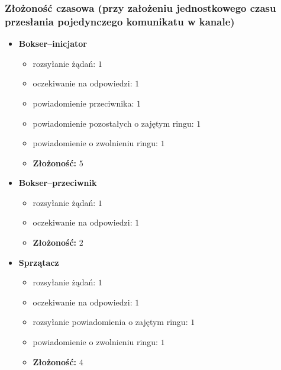 \documentclass{article}
\begin{document}
\subsubsection{Złożoność czasowa (przy założeniu jednostkowego czasu przesłania pojedynczego komunikatu w kanale)}
\begin{itemize}
\item \textbf{Bokser--inicjator}
  \begin{itemize}
  \item rozsyłanie żądań: $1$
  \item oczekiwanie na odpowiedzi: $1$
  \item powiadomienie przeciwnika: $1$
  \item powiadomienie pozostałych o zajętym ringu: $1$
  \item powiadomienie o zwolnieniu ringu: $1$
  \item \textbf{Złożoność:} $5$
  \end{itemize}
\item \textbf{Bokser--przeciwnik}
  \begin{itemize}
  \item rozsyłanie żądań: $1$
  \item oczekiwanie na odpowiedzi: $1$
  \item \textbf{Złożoność:} $2$
  \end{itemize}
\item \textbf{Sprzątacz}
  \begin{itemize}
  \item rozsyłanie żądań: $1$
  \item oczekiwanie na odpowiedzi: $1$
  \item rozsyłanie powiadomienia o zajętym ringu: $1$
  \item powiadomienie o zwolnieniu ringu: $1$
  \item \textbf{Złożoność:} $4$
  \end{itemize}
\end{itemize}

\end{document}
